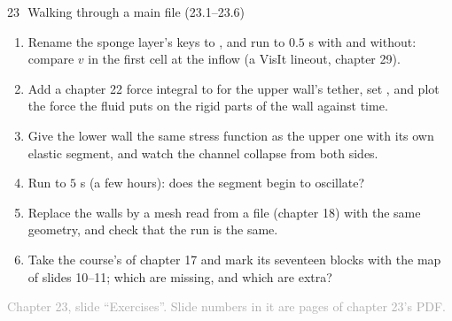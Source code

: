 \documentclass[aspectratio=169,11pt]{beamer}
\newcommand{\sourcecredit}[1]{\vfill\begin{flushright}\tiny\textcolor{DarkGray}{#1}\end{flushright}}
\begin{document}
\begin{frame}{23\,\textbullet\ Walking through a main file (23.1--23.6)}
\label{fr:c23x1}
\footnotesize
\begin{enumerate}
  \item[23.1] Rename the sponge layer's keys to ,  and run  to $0.5$ s with and without: compare $v$ in the first cell at the inflow (a VisIt lineout, chapter 29).
  \item[23.2] Add a chapter 22 force integral to  for the upper wall's tether, set , and plot the force the fluid puts on the rigid parts of the wall against time.
  \item[23.3] Give the lower wall the same stress function as the upper one with its own elastic segment, and watch the channel collapse from both sides.
  \item[23.4] Run  to $5$ s (a few hours): does the segment begin to oscillate?
  \item[23.5] Replace the walls by a mesh read from a file (chapter 18) with the same geometry, and check that the run is the same.
  \item[23.6] Take the course's  of chapter 17 and mark its seventeen blocks with the map of slides 10--11; which are missing, and which are extra?
\end{enumerate}
\sourcecredit{Chapter 23, slide ``Exercises''. Slide numbers in it are pages of chapter 23's PDF.}
\end{frame}
\end{document}
